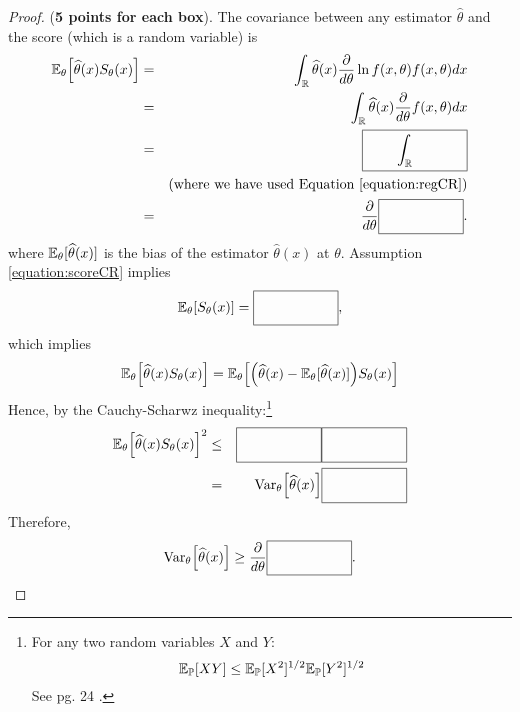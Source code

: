 \documentclass[11pt]{article} %
\begin{document}
\begin{proof}
\noindent  (\textbf{5 points for each box}). The covariance between any estimator $\widehat{\theta}$ and the score (which is a random variable) is
\begin{eqnarray*}
\mathbb{E}_{\theta} \Big[ \widehat{\theta}(x) S_{\theta}(x) \Big] &=&  \int_{\mathbb{R}} \widehat{\theta}(x) \frac{\partial}{d\theta} \ln f(x,\theta) f(x,\theta) dx \\
&=& \int_{\mathbb{R}} \widehat{\theta}(x) \frac{\partial}{d\theta} f(x,\theta) dx \\
&=& \boxed{\quad \quad \Big. \int_{\mathbb{R}} \Big.  \hspace{.5cm} \quad \quad } \\
&& (\text{where we have used Equation \ref{equation:regCR}}) \\
&=& \frac{\partial}{d\theta} \boxed{\quad \quad \Big. \Big.  \hspace{.5cm} \quad \quad }.
\end{eqnarray*}
\noindent where $\mathbb{E}_{\theta}[\widehat{\theta}(x)]$ is the bias of the estimator $\widehat{\theta}(x)$ at $\theta$. Assumption \ref{equation:scoreCR} implies 
$$\mathbb{E}_{\theta}[S_{\theta}(x)]= \boxed{\quad \quad \Big. \Big.  \hspace{.5cm} \quad \quad } \\ ,$$
\noindent which implies
$$\mathbb{E}_{\theta} \Big[ \widehat{\theta}(x) S_{\theta}(x) \Big] = \mathbb{E}_{\theta} \Big[ \Big(\widehat{\theta}(x)-\mathbb{E}_{\theta}[\widehat{\theta}(x)] \Big)S_{\theta}(x) \Big]$$
\noindent Hence, by the Cauchy-Scharwz inequality:\footnote{For any two random variables $X$ and $Y$:
\begin{equation*}
\mathbb{E}_{\mathbb{P}}[XY] \leq \mathbb{E}_{\mathbb{P}}[X^2]^{1/2} \mathbb{E}_{\mathbb{P}}[Y^2]^{1/2}
\end{equation*}
See pg. 24 \cite{durrett2010}. 
}
\begin{eqnarray*}
\mathbb{E}_{\theta} \Big[ \widehat{\theta}(x) S_{\theta}(x) \Big]^2 &\leq&  \boxed{\quad \quad \Big. \Big.  \hspace{.5cm} \quad \quad }  \boxed{\quad \quad \Big. \Big.  \hspace{.5cm} \quad \quad } \\
&=& \text{Var}_{\theta} \Big[ \widehat{\theta}(x) \Big] \boxed{\quad \quad \Big. \Big.  \hspace{.5cm} \quad \quad }
\end{eqnarray*}
\noindent Therefore,
$$\text{Var}_{\theta}\Big[ \widehat{\theta}(x)\Big] \geq  \frac{\partial}{d\theta} \boxed{\quad \quad \Big. \Big.  \hspace{.5cm} \quad \quad }.$$
\end{proof}
\end{document}
